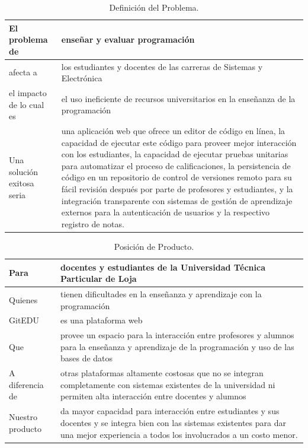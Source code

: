 \begin{table}[h!]
  \begin{tabular}{|p{}|p{}|}
    \hline
    El problema de & enseñar y evaluar programación \\
    \hline
    afecta a & los estudiantes y docentes de las carreras de Sistemas y Electrónica \\
    \hline
    el impacto de lo cual es & el uso ineficiente de recursos universitarios en la enseñanza de la programación \\
    \hline
    Una solución exitosa seria & una aplicación web que ofrece un editor de código en línea, la capacidad de ejecutar este código para proveer mejor interacción con los estudiantes, la capacidad de ejecutar pruebas unitarias para automatizar el proceso de calificaciones, la persistencia de código en un repositorio de control de versiones remoto para su fácil revisión después por parte de profesores y estudiantes, y la integración transparente con sistemas de gestión de aprendizaje externos para la autenticación de usuarios y la respectivo registro de notas. \\
    \hline
  \end{tabular}
  \caption{Definición del Problema.}
  \label{def-prob}
\end{table}

\begin{table}[h!]
  \begin{tabular}{|p{}|p{}|}
    \hline
    Para & docentes y estudiantes de la Universidad Técnica Particular de Loja \\
    \hline
    Quienes & tienen dificultades en la enseñanza y aprendizaje con la programación \\
    \hline
    GitEDU & es una plataforma web \\
    \hline
    Que & provee un espacio para la interacción entre profesores y alumnos para la enseñanza y aprendizaje de la programación y uso de las bases de datos \\
    \hline
    A diferencia de & otras plataformas altamente costosas que no se integran completamente con sistemas existentes de la universidad ni permiten alta interacción entre docentes y alumnos \\
    \hline
    Nuestro producto & da mayor capacidad para interacción entre estudiantes y sus docentes y se integra bien con las sistemas existentes para dar una mejor experiencia a todos los involucrados a un costo menor. \\
    \hline
  \end{tabular}
  \caption{Posición de Producto.}
  \label{pos-prod}
\end{table}

